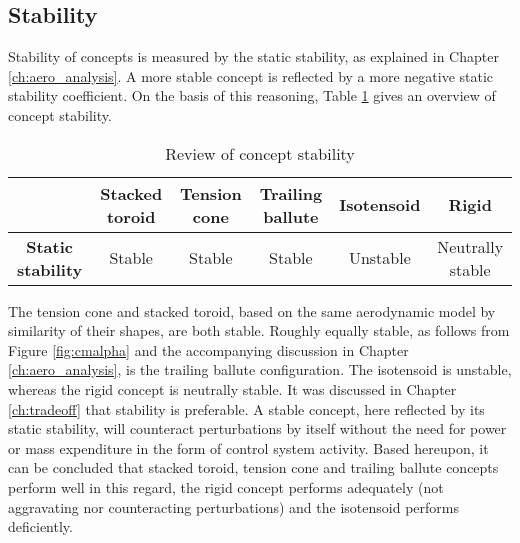 \subsection{Stability}
Stability of concepts is measured by the static stability, as explained in Chapter \ref{ch:aero_analysis}. A more stable concept is reflected by a more negative static stability coefficient. On the basis of this reasoning, Table \ref{tab:stab} gives an overview of concept stability.

\begin{table}[h]
\centering
\caption{Review of concept stability}
\begin{tabular}{|c|c|c|c|c|c|}
\hline
\textbf{}                          & \textbf{Stacked toroid} & \textbf{Tension cone} & \textbf{Trailing ballute} & \textbf{Isotensoid} & \textbf{Rigid} \\ \hline
\textbf{Static stability} &\cellcolor{green!70} Stable  &\cellcolor{green!70}  Stable   &\cellcolor{green!70} Stable & \cellcolor{red!60}   Unstable          &\cellcolor{yellow!75} Neutrally stable                 \\ \hline
\end{tabular}
\label{tab:stab}
\end{table}

The tension cone and stacked toroid, based on the same aerodynamic model by similarity of their shapes, are both stable. Roughly equally stable, as follows from Figure \ref{fig:cmalpha} and the accompanying discussion in Chapter \ref{ch:aero_analysis}, is the trailing ballute configuration. The isotensoid is unstable, whereas the rigid concept is neutrally stable. It was discussed in Chapter \ref{ch:tradeoff} that stability is preferable. A stable concept, here reflected by its static stability, will counteract perturbations by itself without the need for power or mass expenditure in the form of control system activity. Based hereupon, it can be concluded that stacked toroid, tension cone and trailing ballute concepts perform well in this regard, the rigid concept performs adequately (not aggravating nor counteracting perturbations) and the isotensoid performs deficiently. 

